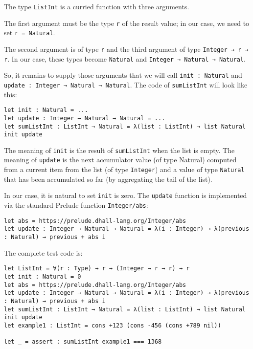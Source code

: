 The type \lstinline!ListInt! is a curried function with three arguments.


The first argument must be the type \lstinline!r! of the result value; in our case, we need to set \lstinline!r = Natural!.


The second argument is of type \lstinline!r! and the third argument of type \lstinline!Integer → r → r!.
In our case, these types become \lstinline!Natural! and \lstinline!Integer → Natural → Natural!.


So, it remains to supply those arguments that we will call \lstinline!init : Natural! and \lstinline!update : Integer → Natural → Natural!.
The code of \lstinline!sumListInt! will look like this:


\begin{lstlisting}[language=Dhall]
let init : Natural = ...
let update : Integer → Natural → Natural = ...
let sumListInt : ListInt → Natural = λ(list : ListInt) → list Natural init update
\end{lstlisting}


The meaning of \lstinline!init! is the result of \lstinline!sumListInt! when the list is empty.
The meaning of \lstinline!update! is the next accumulator value (of type Natural) computed from a current item from the list (of type \lstinline!Integer!) and a value of type \lstinline!Natural! that has been accumulated so far (by aggregating the tail of the list).


In our case, it is natural to set \lstinline!init! is zero.
The \lstinline!update! function is implemented via the standard Prelude function \lstinline!Integer/abs!:


\begin{lstlisting}[language=Dhall]
let abs = https://prelude.dhall-lang.org/Integer/abs
let update : Integer → Natural → Natural = λ(i : Integer) → λ(previous : Natural) → previous + abs i
\end{lstlisting}


The complete test code is:


\begin{lstlisting}[language=Dhall]
let ListInt = ∀(r : Type) → r → (Integer → r → r) → r
let init : Natural = 0
let abs = https://prelude.dhall-lang.org/Integer/abs
let update : Integer → Natural → Natural = λ(i : Integer) → λ(previous : Natural) → previous + abs i
let sumListInt : ListInt → Natural = λ(list : ListInt) → list Natural init update
let example1 : ListInt = cons +123 (cons -456 (cons +789 nil))

let _ = assert : sumListInt example1 === 1368
\end{lstlisting}


